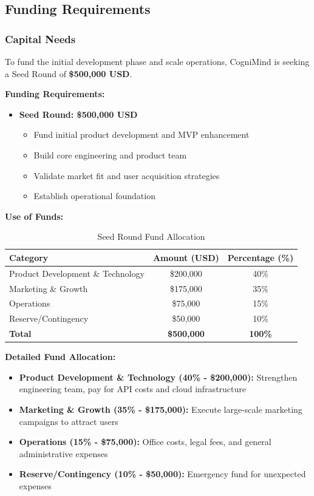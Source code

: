 \subsection{Funding Requirements}
\subsubsection{Capital Needs}
To fund the initial development phase and scale operations, CogniMind is seeking a Seed Round of \textbf{\$500,000 USD}.

\textbf{Funding Requirements:}
\begin{itemize}
    \item \textbf{Seed Round: \$500,000 USD}
    \begin{itemize}
        \item Fund initial product development and MVP enhancement
        \item Build core engineering and product team
        \item Validate market fit and user acquisition strategies
        \item Establish operational foundation
    \end{itemize}
\end{itemize}

\textbf{Use of Funds:}
\begin{table}[h]
\centering
\begin{tabular}{|l|c|c|}
\hline
\textbf{Category} & \textbf{Amount (USD)} & \textbf{Percentage (\%)} \\
\hline
Product Development \& Technology & \$200,000 & 40\% \\
Marketing \& Growth & \$175,000 & 35\% \\
Operations & \$75,000 & 15\% \\
Reserve/Contingency & \$50,000 & 10\% \\
\hline
\textbf{Total} & \textbf{\$500,000} & \textbf{100\%} \\
\hline
\end{tabular}
\caption{Seed Round Fund Allocation}
\end{table}

\textbf{Detailed Fund Allocation:}
\begin{itemize}
    \item \textbf{Product Development \& Technology (40\% - \$200,000):} Strengthen engineering team, pay for API costs and cloud infrastructure
    \item \textbf{Marketing \& Growth (35\% - \$175,000):} Execute large-scale marketing campaigns to attract users
    \item \textbf{Operations (15\% - \$75,000):} Office costs, legal fees, and general administrative expenses
    \item \textbf{Reserve/Contingency (10\% - \$50,000):} Emergency fund for unexpected expenses
\end{itemize}

